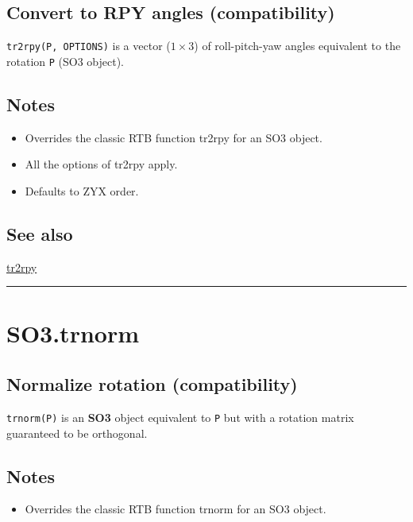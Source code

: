 \subsection*{Convert to RPY angles (compatibility)}


\texttt{tr2rpy(P, OPTIONS)} is a vector ($1 \times 3$) of roll-pitch-yaw angles
equivalent to the rotation \texttt{P} (SO3 object).


\subsection*{Notes}
\begin{itemize}
  \item Overrides the classic RTB function tr2rpy for an SO3 object.
  \item All the options of tr2rpy apply.
  \item Defaults to ZYX order.
\end{itemize}

\subsection*{See also}


\hyperlink{tr2rpy}{\color{blue} tr2rpy}

\vspace{1.5ex}\hrule

\hypertarget{SO3.trnorm}{\section*{SO3.trnorm}}
\subsection*{Normalize rotation (compatibility)}


\texttt{trnorm(P)} is an \textbf{\color{red} SO3} object equivalent to \texttt{P} but with a rotation
matrix guaranteed to be orthogonal.


\subsection*{Notes}
\begin{itemize}
  \item Overrides the classic RTB function trnorm for an SO3 object.
\end{itemize}

